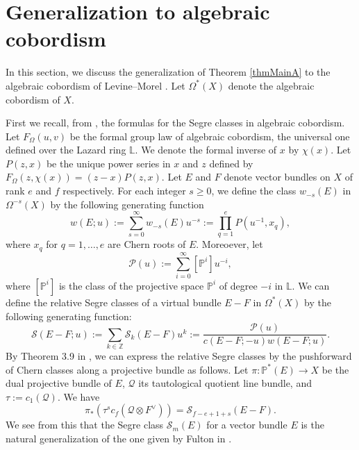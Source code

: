 \documentclass[12pt, reqno,sumlimits]{amsart}
\theoremstyle{definition}
\numberwithin{equation}{section}
\newcommand{\LL}{{\mathbb L}}
\newcommand{\PP}{{\mathbb P}}
\newcommand{\ZZ}{{\mathbb Z}}
\newcommand{\calQ}{{\mathcal Q}}
\newcommand{\scP}{{\mathscr P}}
\newcommand{\scS}{{\mathscr S}}
\newcommand{\rk}{{\operatorname{rk}}}
\begin{document}
\section{Generalization to algebraic cobordism}\label{SecAlgCob}
In this section, we discuss the generalization of Theorem \ref{thmMainA} to the algebraic cobordism of Levine--Morel \cite{LevineMorel}. Let $\Omega^*(X)$ denote the algebraic cobordism of $X$.

First we recall, from \cite{HudsonMatsumura}, the formulas for the Segre classes in algebraic cobordism. Let $F_\Omega(u,v)$ be the formal group law of algebraic cobordism, the universal one defined over the Lazard ring $\LL$. We denote the formal inverse of $x$ by $\chi(x)$. Let $P(z,x)$ be the unique power series in $x$ and $z$ defined by $F_{\Omega}(z,\chi(x))=(z-x)P(z,x)$. Let $E$ and $F$ denote vector bundles on $X$ of rank $e$ and $f$ respectively. For each integer $s\geq 0$, we define the class $w_{-s}(E)$ in $\Omega^{-s}(X)$ by the following generating function
\[
w(E;u):=\sum_{s= 0}^{\infty} {w}_{-s}(E) u^{-s} := \prod_{q=1}^e P(u^{-1}, x_{q}),
\]
where $x_q$ for $q=1,\dots,e$ are Chern roots of $E$. Moreoever, let 
\[
\scP(u):=\sum_{i=0}^{\infty} [\PP^i]u^{-i},
\]
where $[\PP^i]$ is the class of the projective space $\PP^i$ of degree $-i$ in $\LL$. We can define the relative Segre classes of a virtual bundle $E-F$ in $\Omega^*(X)$ by the following generating function:
\begin{equation}\label{relSegALG}
\scS(E-F;u) := \sum_{k\in \ZZ} \scS_k(E-F)u^k:= \frac{\scP(u)}{c(E-F;-u)w(E-F;u)}.%
\end{equation}
By Theorem 3.9 in \cite{HudsonMatsumura}, we can express the relative Segre classes by the pushforward of Chern classes along a projective bundle as follows. Let $\pi: \PP^*(E) \to X$ be the dual projective bundle of $E$, $\calQ$ its tautological quotient line bundle, and $\tau:=c_1(\calQ)$. We have
\begin{equation}\label{pushSegAlg}
\pi_*(\tau^s c_f(\calQ \otimes F^{\vee}))  = \scS_{f-e+1+s}(E-F).
\end{equation}
We see from this that the Segre class $\scS_m(E)$ for a vector bundle $E$ is the natural generalization of the one given by Fulton in \cite{FultonIntersection}.
\end{document}
